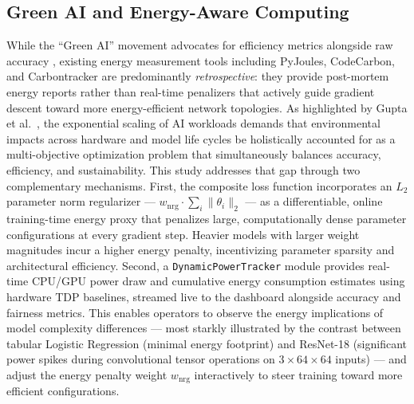 \documentclass[12pt,a4paper]{article}
\begin{document}
\subsection{Green AI and Energy-Aware Computing}
While the ``Green AI'' movement advocates for efficiency metrics alongside raw accuracy \cite{schwartz2020green}, existing energy measurement tools including PyJoules, CodeCarbon, and Carbontracker are predominantly \textit{retrospective}: they provide post-mortem energy reports rather than real-time penalizers that actively guide gradient descent toward more energy-efficient network topologies. As highlighted by Gupta et al.\ \cite{gupta2023towards}, the exponential scaling of AI workloads demands that environmental impacts across hardware and model life cycles be holistically accounted for as a multi-objective optimization problem that simultaneously balances accuracy, efficiency, and sustainability.
This study addresses that gap through two complementary mechanisms. First, the composite loss function incorporates an $L_2$ parameter norm regularizer --- $w_{\text{nrg}} \cdot \sum_{i}\|\theta_i\|_2$ --- as a differentiable, online training-time energy proxy that penalizes large, computationally dense parameter configurations at every gradient step. Heavier models with larger weight magnitudes incur a higher energy penalty, incentivizing parameter sparsity and architectural efficiency. Second, a \texttt{DynamicPowerTracker} module provides real-time CPU/GPU power draw and cumulative energy consumption estimates using hardware TDP baselines, streamed live to the dashboard alongside accuracy and fairness metrics. This enables operators to observe the energy implications of model complexity differences --- most starkly illustrated by the contrast between tabular Logistic Regression (minimal energy footprint) and ResNet-18 (significant power spikes during convolutional tensor operations on $3 \times 64 \times 64$ inputs) --- and adjust the energy penalty weight $w_{\text{nrg}}$ interactively to steer training toward more efficient configurations.
\end{document}

